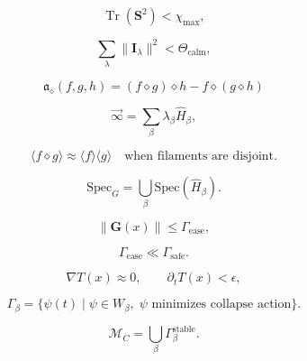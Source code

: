 \[
\operatorname{Tr}(\mathbf{S}^2)
<
\chi_{\mathrm{max}},
\]

\[
\sum_{\lambda}
\|\mathbf{I}_{\lambda}\|^2
<
\Theta_{\mathrm{calm}},
\]

\[
\mathfrak{a}_\diamond(f,g,h)
= (f \diamond g)\diamond h - f \diamond (g \diamond h)
\]

\[
\vec{\infty} = 
\sum_{\beta} \lambda_\beta \hat{H}_\beta,
\]

\[
\langle f \diamond g \rangle
\approx
\langle f \rangle \langle g \rangle
\quad\text{when filaments are disjoint.}
\]

\[
\mathrm{Spec}_G = 
\bigcup_{\beta} \mathrm{Spec}(\hat{H}_\beta).
\]

\[
\|\mathbf{G}(x)\| \le \Gamma_{\text{ease}},
\]

\[
\Gamma_{\text{ease}} \ll \Gamma_{\text{safe}}.
\]

\[
\nabla T(x) \approx 0, \qquad 
\partial_t T(x) < \epsilon,
\]

\[
\Gamma_\beta = \{\psi(t)\;|\;\psi \in W_\beta,\; \psi \text{ minimizes collapse action}\}.
\]

\[
\mathcal{M}_C =
\bigcup_{\beta}
\Gamma_\beta^{\mathrm{stable}}.
\]

